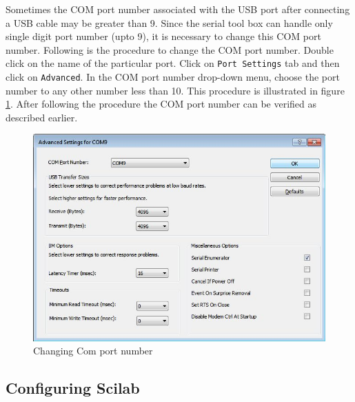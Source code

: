 Sometimes the COM port number associated with the USB port after connecting a USB cable may be greater than 9. Since the serial tool box can handle only single digit port number (upto 9), it is necessary to change this COM port number. Following is the procedure to change the COM port number.
Double click on the name of the particular port. Click on { \tt Port Settings} tab and then click on { \tt Advanced}. In the COM port number drop-down menu, choose the port number to any other number less than 10. This procedure is illustrated in figure \ref{com_change}. After following the procedure the COM port number can be verified as described earlier.
\begin{figure}
\centering
\includegraphics[width=0.7\linewidth]{using-sbhs/port2.jpg}
\caption{Changing Com port number}
\label{com_change}
\end{figure}
\subsection{Configuring Scilab}
\label{scilab_sbhs}

